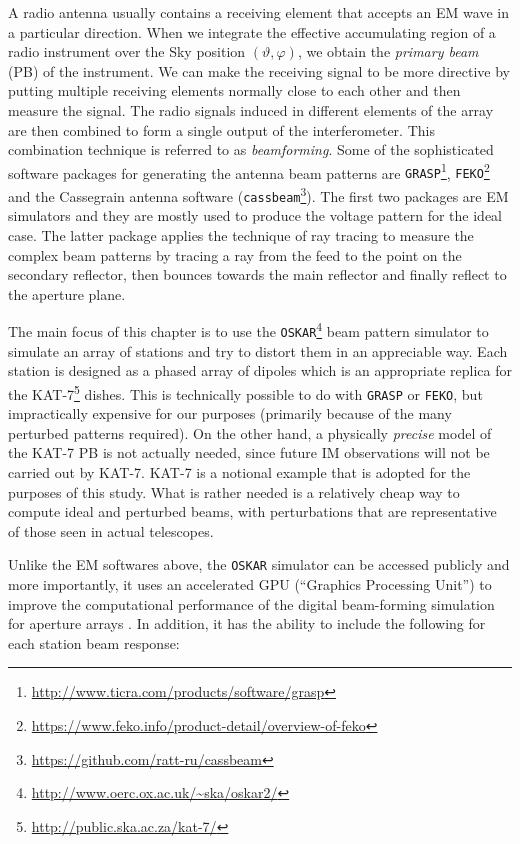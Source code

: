 A radio antenna usually contains a receiving element that accepts an EM wave in a particular direction. When we integrate the effective accumulating region of a radio instrument over the Sky position $(\vartheta, \varphi)$, we obtain the \emph{primary beam} (PB) of the instrument. We can make the receiving signal to be more directive by putting multiple receiving elements normally close to each other and then measure the signal.
The radio signals induced in different elements of the array are then combined to form a single output of the interferometer. This combination technique is referred to as \emph{beamforming}. Some of the sophisticated software packages for generating the antenna beam patterns are 
{\tt GRASP}\footnote{\url{http://www.ticra.com/products/software/grasp}}, {\tt FEKO}\footnote{\url{ https://www.feko.info/product-detail/overview-of-feko}} 
and the Cassegrain antenna software ({\tt cassbeam}\footnote{\url{ https://github.com/ratt-ru/cassbeam}})\citep{Brisken2003}.
The first two packages are EM simulators and they are mostly used to produce the voltage pattern for the ideal case. The latter package applies 
the technique of ray tracing to measure the complex beam patterns by tracing a ray from the feed to the point on the secondary reflector, 
then bounces towards the main reflector and finally reflect to the aperture plane. 

The main focus of this chapter is to use the {\tt OSKAR}\footnote{\url{http://www.oerc.ox.ac.uk/~ska/oskar2/}} \citep{2009wska.confE..31D}
beam pattern simulator to simulate an array of stations and try to distort them in an appreciable way.
Each station is designed as a phased array of dipoles which is an appropriate replica for the KAT-7\footnote{\url{ http://public.ska.ac.za/kat-7/}} dishes.
This is technically possible to do with {\tt GRASP} or {\tt FEKO}, but impractically expensive for our purposes 
(primarily because of the many perturbed patterns required). On the other hand, a physically  \emph{precise}
model of the KAT-7 PB is not actually needed, since future IM observations will not be carried out by KAT-7. KAT-7
is a notional example that is adopted for the purposes of this study. 
What is rather needed is a relatively cheap way to compute ideal and perturbed beams, with perturbations that are representative of those seen in actual telescopes.

Unlike the EM softwares above, the {\tt OSKAR} simulator can be accessed publicly and more importantly, it uses an accelerated GPU (\enquote{Graphics Processing
Unit}) to improve the computational performance of the  digital beam-forming simulation for aperture arrays \citep{2009wska.confE..31D,mort2010oskar}. In addition, 
it has the ability to include the following for each station beam response:

